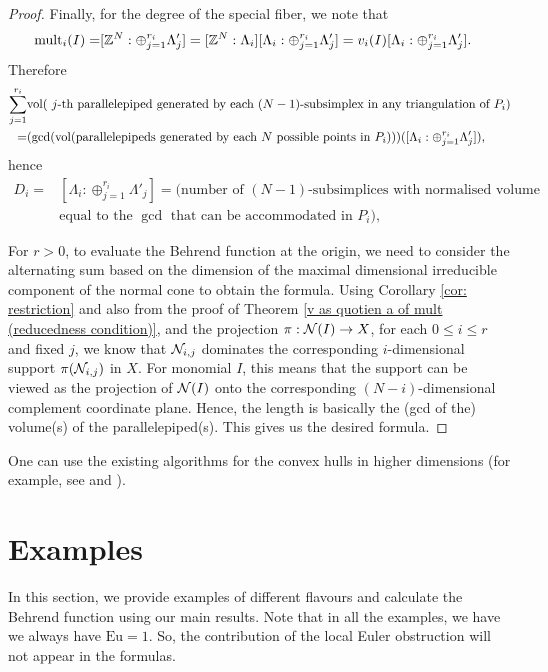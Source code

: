 \documentclass[11pt,a4paper,leqno,noamsfonts]{amsart}
\numberwithin{equation}{section}
\begin{document}
\begin{proof}
Finally, for the degree of the special fiber,  we note that
\begin{align*}
     \mathrm{mult}_i(I)=& [{\mathbb{Z}}^N:\oplus_{j=1}^{r_i}\Lambda'_{j}]=[{\mathbb{Z}}^N:\Lambda_i][\Lambda_i:\oplus_{j=1}^{r_i}\Lambda'_{j}]=v_i(I)[\Lambda_i:\oplus_{j=1}^{r_i}\Lambda'_{j}].
\end{align*}
Therefore
\begin{align*}
    \sum_{j=1}^{r_i}&{\mathrm{vol}}(\text{ $j$-th parallelepiped generated by each $(N-1)$-subsimplex in any 
    triangulation of $P_i$})\\=&(\gcd({\mathrm{vol}}(\text{parallelepipeds generated by each $N$ possible points in $P_i$})))([\Lambda_i:\oplus_{j=1}^{r_i}\Lambda'_{j}]),
\end{align*}
hence
\begin{align*}
   D_i =&[\Lambda_i:\oplus_{j=1}^{r_i}\Lambda'_{j}]=(\text{number of $(N-1)$-subsimplices with normalised volume} \\&\text{equal to the $\gcd$ that can be accommodated in $P_i$}),
\end{align*}




For $r>0$, to evaluate the Behrend function at the origin, we need to consider the alternating sum based on the dimension of the maximal dimensional irreducible component of the normal cone to obtain the formula. Using Corollary  \ref{cor: restriction} and also from the proof of  Theorem  \ref{v as quotien a of mult (reducedness condition)}, and the projection $\pi: {\mathcal N}(I)\to X$, for each $0\leq i \leq r$ and fixed $j$, we know that ${\mathcal N}_{i,j}$ dominates the corresponding $i$-dimensional support $\pi({\mathcal N}_{i,j})$ in $X$. For monomial $I$, this means that the support can be viewed as the projection of ${\mathcal N}(I)$ onto the corresponding $(N-i)$-dimensional complement coordinate plane. Hence, the length is basically the (gcd of the) volume(s) of the parallelepiped(s). This gives us the desired formula.
\end{proof}

\begin{remark}
    One can use the existing algorithms for the convex hulls in higher dimensions (for example, see \cite{Avis-Bremner-Seidel97} and \cite{Barber-Dobkin-Huhdanpaa96}).
\end{remark}

\section{Examples}
In this section, we provide examples of different flavours and calculate the Behrend function using our main results. Note that in all the examples, we have we always have $\mathrm{Eu}=1$. So, the contribution of the local Euler obstruction will not appear in the formulas.
\end{document}
